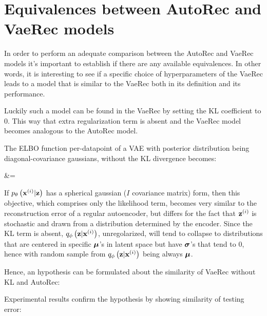 \section{Equivalences between AutoRec and VaeRec models}

In order to perform an adequate comparison between the AutoRec and VaeRec
models it's important to establish if there are any available equivalences.
In other words, it is interesting to see if a specific choice of hyperparameters
of the VaeRec leads to a model that is similar to the VaeRec both in its definition
and its performance.

Luckily such a model can be found in the VaeRec by setting the KL coefficient to 0.
This way that extra regularization term is absent and the VaeRec model becomes analogous
to the AutoRec model.

The ELBO function per-datapoint of a VAE 
with posterior distribution being diagonal-covariance gaussians,
without the KL divergence becomes:

\begin{nalign}
\elboxi
&= \expectqphi{\log \pxicond}\\
\end{nalign}

If $p_\theta\left({\mathbf{x}^{(i)}}|\mathbf{z}\right)$ has a spherical gaussian ($I$ covariance matrix) form,
then this objective, which comprises only the likelihood term,
becomes very similar to the reconstruction error
of a regular autoencoder, but differs for the fact that ${\mathbf{z}^{(i)}}$
is stochastic and drawn from a distribution determined by the encoder.
Since the KL term is absent, $q_\phi\left(\mathbf{z}|{\mathbf{x}^{(i)}}\right)$, unregolarized,
will tend to collapse to distributions that are centered in specific $\boldsymbol\mu$'s in latent
space but have $\boldsymbol\sigma$'s that tend to 0, hence with
random sample from $q_\phi\left(\mathbf{z}|{\mathbf{x}^{(i)}}\right)$ being always $\boldsymbol\mu$.

Hence, an hypothesis can be formulated about the similarity of VaeRec without KL
and AutoRec:

Experimental results confirm the hypothesis by showing similarity of testing error:

